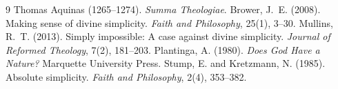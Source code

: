 \documentclass{situationist-preprint}
\begin{document}
\begin{thebibliography}{9}\small
{} Thomas Aquinas (1265--1274). \emph{Summa Theologiae}.
 Brower, J.~E. (2008). Making sense of divine simplicity. \emph{Faith and Philosophy}, 25(1), 3--30.
 Mullins, R.~T. (2013). Simply impossible: A case against divine simplicity. \emph{Journal of Reformed Theology}, 7(2), 181--203.
 Plantinga, A. (1980). \emph{Does God Have a Nature?} Marquette University Press.
 Stump, E. and Kretzmann, N. (1985). Absolute simplicity. \emph{Faith and Philosophy}, 2(4), 353--382.
\end{thebibliography}
\end{document}

